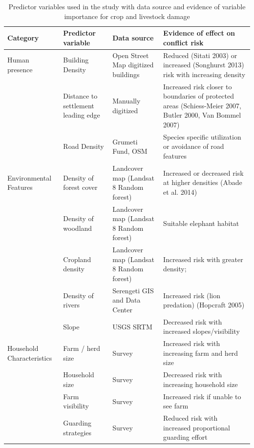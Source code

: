 \documentclass[12pt,]{article}
\begin{document}
\begin{landscape}
\begin{table}[]
\centering
\footnotesize
\caption{Predictor variables used in the study with data source and evidence of variable importance for crop and livestock damage}
\begin{tabular}{p{3cm}p{5cm}p{5cm}p{5cm}}
\hline
\textbf{Category}                       & \textbf{Predictor variable}  & \textbf{Data source}            & \textbf{Evidence of effect on conflict risk}         \\ \hline
Human presence                          & Building Density                 & Open Street Map digitized buildings       & Reduced (Sitati 2003) or increased (Songhurst 2013) risk with increasing density                  \\
                               & Distance to settlement leading edge     & Manually digitized                              & Increased risk closer to boundaries of protected areas (Schiess-Meier 2007, Butler 2000, Van Bommel 2007)         \\
                                  & Road Density      &    Grumeti Fund, OSM     & Species specific utilization or avoidance of road features                 \\
Environmental Features                                & Density of forest cover        & Landcover map (Landsat 8 Random forest)   & Increased or decreased risk at higher densities (Abade et al. 2014)      \\
                                   & Density of woodland        &  Landcover map (Landsat 8 Random forest)              & Suitable elephant habitat    \\
                         & Cropland density &  Landcover map (Landsat 8 Random forest)  & Increased risk with greater density; \\
                                    & Density of rivers        &  Serengeti GIS and Data Center              & Increased risk (lion predation) (Hopcraft 2005)  \\
                                    & Slope                    & USGS SRTM            & Decreased risk with increased slopes/visibility  \\
Household Characteristics & Farm / herd size    & Survey                 & Increased risk with increasing  farm and herd size                      \\
        & Household size    & Survey  & Decreased risk with increasing household size                      \\
                                          & Farm visibility     &     Survey              & Increased risk if unable to see farm        \\
                                  & Guarding strategies & Survey                   & Reduced risk with increased proportional guarding effort       \\       \hline                                                                           
\end{tabular}

\label{tab:predictorvariables}
\end{table}
\end{landscape}
\end{document}
